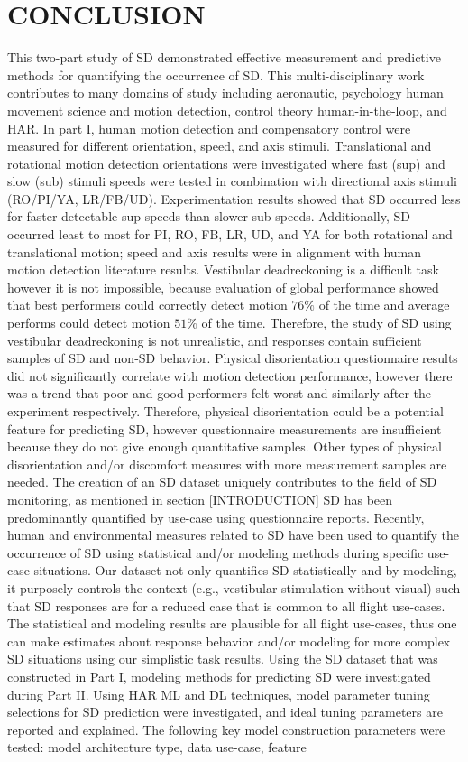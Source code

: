 \documentclass{ieeeaccess}
\begin{document}
\section{CONCLUSION}
This two-part study of SD demonstrated effective measurement and predictive methods for quantifying the occurrence of SD. This multi-disciplinary work contributes to many domains of study including aeronautic, psychology human movement science and motion detection, control theory human-in-the-loop, and HAR. In part I, human motion detection and compensatory control were measured for different orientation, speed, and axis stimuli. Translational and rotational motion detection orientations were investigated where fast (sup) and slow (sub) stimuli speeds were tested in combination with directional axis stimuli (RO/PI/YA, LR/FB/UD). Experimentation results showed that SD occurred less for faster detectable sup speeds than slower sub speeds. Additionally, SD occurred least to most for PI, RO, FB, LR, UD, and YA for both rotational and translational motion; speed and axis results were in alignment with human motion detection literature results. Vestibular deadreckoning is a difficult task however it is not impossible, because evaluation of global performance showed that best performers could correctly detect motion $76\%$ of the time and average performs could detect motion $51\%$ of the time. Therefore, the study of SD using vestibular deadreckoning is not unrealistic, and responses contain sufficient samples of SD and non-SD behavior. Physical disorientation questionnaire results did not significantly correlate with motion detection performance, however there was a trend that poor and good performers felt worst and similarly after the experiment respectively. Therefore, physical disorientation could be a potential feature for predicting SD, however questionnaire measurements are insufficient because they do not give enough quantitative samples. Other types of physical disorientation and/or discomfort measures with more measurement samples are needed. The creation of an SD dataset uniquely contributes to the field of SD monitoring, as mentioned in section \ref{INTRODUCTION} SD has been predominantly quantified by use-case using questionnaire reports. Recently, human and environmental measures related to SD have been used to quantify the occurrence of SD using statistical and/or modeling methods during specific use-case situations.  Our dataset not only quantifies SD statistically and by modeling, it purposely controls the context (e.g., vestibular stimulation without visual) such that SD responses are for a reduced case that is common to all flight use-cases. The statistical and modeling results are plausible for all flight use-cases, thus one can make estimates about response behavior and/or modeling for more complex SD situations using our simplistic task results. Using the SD dataset that was constructed in Part I, modeling methods for predicting SD were investigated during Part II. Using HAR ML and DL techniques, model parameter tuning selections for SD prediction were investigated, and ideal tuning parameters are reported and explained. The following key model construction parameters were tested: model architecture type, data use-case, feature 
\end{document}
